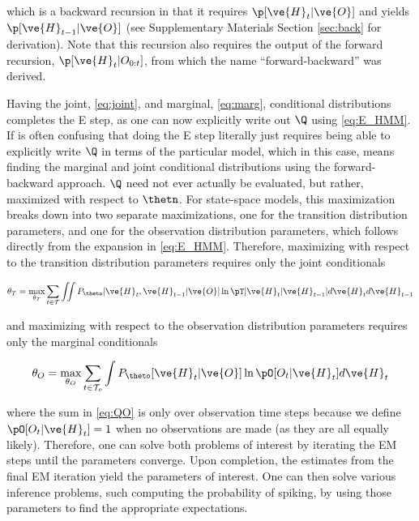 \noindent which is a backward recursion in that it requires $\p [\ve{H}_t | \ve{O}]$ and yields $\p [\ve{H}_{t-1} | \ve{O}]$ (see Supplementary Materials Section \ref{sec:back} for derivation).  Note that this recursion also requires the output of the forward recursion, $\p [\ve{H}_t | O_{0:t}]$, from which the name ``forward-backward'' was derived.

Having the joint, \eqref{eq:joint}, and marginal, \eqref{eq:marg}, conditional distributions completes the E step, as one can now explicitly write out $\Q$ using \eqref{eq:E_HMM}.  If is often confusing that doing the E step literally just requires being able to explicitly write $\Q$ in terms of the particular model, which in this case, means finding the marginal and joint conditional distributions using the forward-backward approach.  $\Q$ need not ever actually be evaluated, but rather, maximized with respect to $\thetn$.  For state-space models, this maximization breaks down into two separate maximizations, one for the transition distribution parameters, and one for the observation distribution parameters, which follows directly from the expansion in \eqref{eq:E_HMM}.  Therefore, maximizing with respect to the transition distribution parameters requires only the joint conditionals

\begin{align}\label{eq:QT}
\theta_T = \max_{\theta_T} \sum_{t\in\mathcal{T}} \iint %
P_{\theto} [\ve{H}_t,\ve{H}_{t-1} | \ve{O}]  \ln \pT [\ve{H}_t |  \ve{H}_{t-1}] d\ve{H}_t d\ve{H}_{t-1}
\end{align} %

\noindent and maximizing with respect to the observation distribution parameters requires only the marginal conditionals

\begin{align}\label{eq:QO}
\theta_O = \max_{\theta_O} \sum_{t\in\mathcal{T}_o} \int %
P_{\theto} [\ve{H}_t | \ve{O}]  \ln \pO [O_t |  \ve{H}_t] d\ve{H}_t
\end{align}

\noindent where the sum in \eqref{eq:QO} is only over observation time steps because we define $\pO[O_t|\ve{H}_t]=1$ when no observations are made (as they are all equally likely). Therefore, one can solve both problems of interest by iterating the EM steps until the parameters converge.  Upon completion, the estimates from the final EM iteration yield the parameters of interest.  One can then solve various inference problems, such computing the probability of spiking, by using those parameters to find the appropriate expectations.  %

